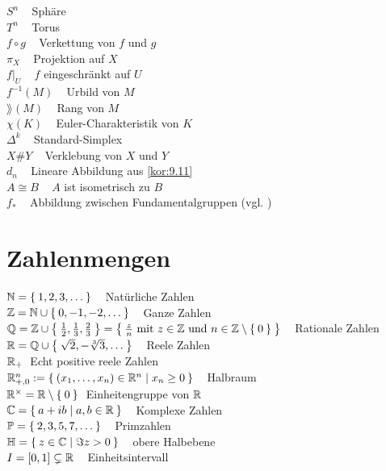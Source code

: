 $S^n\;\;\;$ Sphäre\\
$T^n\;\;\;$ Torus\\

$f \circ g\;\;\;$ Verkettung von $f$ und $g$\\
$\pi_X\;\;\;$ Projektion auf $X$\\
$f|_U\;\;\;$ $f$ eingeschränkt auf $U$\\
$f^{-1}(M)\;\;\;$ Urbild von $M$\\
$\rang(M)\;\;\;$ Rang von $M$\\
$\chi(K)\;\;\;$ Euler-Charakteristik von $K$\\
$\Delta^k\;\;\;$ Standard-Simplex\\
$X \# Y\;\;\;$ Verklebung von $X$ und $Y$\\
$d_n\;\;\;$ Lineare Abbildung aus \cref{kor:9.11}\\
$A \cong B\;\;\;$ $A$ ist isometrisch zu $B$\\
$f_*\;\;\;$ Abbildung zwischen Fundamentalgruppen (vgl. )
\onecolumn

\section*{Zahlenmengen}
$\mathbb{N} = \Set{1, 2, 3, \dots} \;\;\;$ Natürliche Zahlen\\
$\mathbb{Z} = \mathbb{N} \cup \Set{0, -1, -2, \dots} \;\;\;$ Ganze Zahlen\\
$\mathbb{Q} = \mathbb{Z} \cup \Set{\frac{1}{2}, \frac{1}{3}, \frac{2}{3}} = \Set{\frac{z}{n} \text{ mit } z \in \ensuremath{\mathbb{Z}}\text{ und } n \in \ensuremath{\mathbb{Z}}\setminus \Set{0}} \;\;\;$ Rationale Zahlen\\
$\mathbb{R} = \mathbb{Q} \cup \Set{\sqrt{2}, -\sqrt[3]{3}, \dots}\;\;\;$ Reele Zahlen\\
$\mathbb{R}_+\;$ Echt positive reele Zahlen\\
$\mathbb{R}_{+,0}^n := \Set{(x_1, \dots, x_n) \in \ensuremath{\mathbb{R}}^n | x_n \geq 0}\;\;\;$ Halbraum\\
$\mathbb{R}^\times = \mathbb{R} \setminus \Set{0} \;$ Einheitengruppe von $\mathbb{R}$\\
$\mathbb{C} = \Set{a+ib|a,b \in \ensuremath{\mathbb{R}}}\;\;\;$ Komplexe Zahlen\\
$\mathbb{P} = \Set{2, 3, 5, 7, \dots}\;\;\;$ Primzahlen\\
$\mathbb{H} = \Set{z \in \ensuremath{\mathbb{C}}| \Im{z} > 0}\;\;\;$ obere Halbebene\\
$I = [0,1] \subsetneq \mathbb{R}\;\;\;$ Einheitsintervall\\

